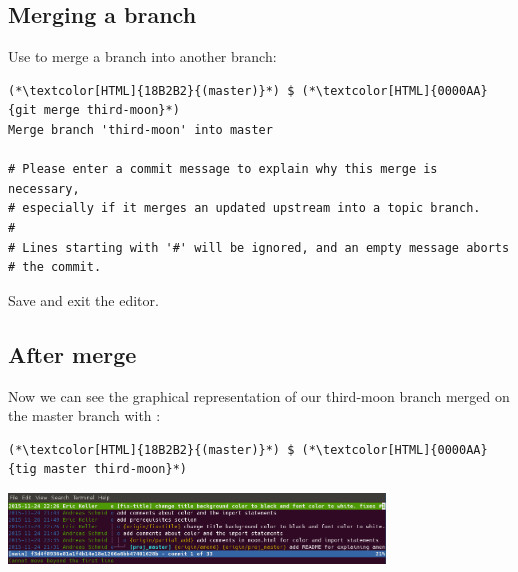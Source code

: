 \subsection{Merging a branch}
\begin{frame}[fragile]
  \subslidetitle

  Use  to merge a branch into another branch:

  \begin{lstlisting}
(*\textcolor[HTML]{18B2B2}{(master)}*) $ (*\textcolor[HTML]{0000AA}{git merge third-moon}*)
Merge branch 'third-moon' into master

# Please enter a commit message to explain why this merge is necessary,
# especially if it merges an updated upstream into a topic branch.
#
# Lines starting with '#' will be ignored, and an empty message aborts
# the commit.
\end{lstlisting}

  Save and exit the editor.

\end{frame}

\subsection{After merge}
\begin{frame}[fragile]
  \subslidetitle

  Now we can see the graphical representation of our third-moon branch merged on the master branch with :
  \begin{lstlisting}
(*\textcolor[HTML]{18B2B2}{(master)}*) $ (*\textcolor[HTML]{0000AA}{tig master third-moon}*)
\end{lstlisting}

  \vspace{1em}

  \centerline{\includegraphics[width=10cm]{../screen/tig-fix-title-rebase-master.png}}

\end{frame}


